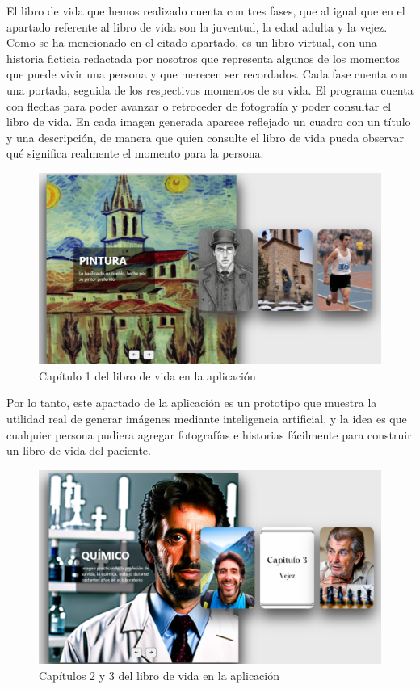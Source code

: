 El libro de vida que hemos realizado cuenta con tres fases, que al igual que en el apartado referente al libro de vida son la juventud, la edad adulta y la vejez. Como se ha mencionado en el citado apartado, es un libro virtual, con una historia ficticia redactada por nosotros que representa algunos de los momentos que puede vivir una persona y que merecen ser recordados. Cada fase cuenta con una portada, seguida de los respectivos momentos de su vida. El programa cuenta con flechas para poder avanzar o retroceder de fotografía y poder consultar el libro de vida. En cada imagen generada aparece reflejado un cuadro con un título y una descripción, de manera que quien consulte el libro de vida pueda observar qué significa realmente el momento para la persona.\\ 


\begin{figure}[!htb]
	\centering
	\includegraphics[width = 0.9
	\textwidth]{Imagenes/Vectorial/fase1librovidapp.png}
	\caption{Capítulo 1 del libro de vida en la aplicación}
	\label{fig:fase1librovidapp}
\end{figure}

Por lo tanto, este apartado de la aplicación es un prototipo que muestra la utilidad real de generar imágenes mediante inteligencia artificial, y la idea es que cualquier persona pudiera agregar fotografías e historias fácilmente para construir un libro de vida del paciente.\\


\begin{figure}[!htb]
	\centering
	\includegraphics[width = 0.9
	\textwidth]{Imagenes/Vectorial/fase23librovidapp.png}
	\caption{Capítulos 2 y 3 del libro de vida en la aplicación}
	\label{fig:fase23librovidapp}
\end{figure}
